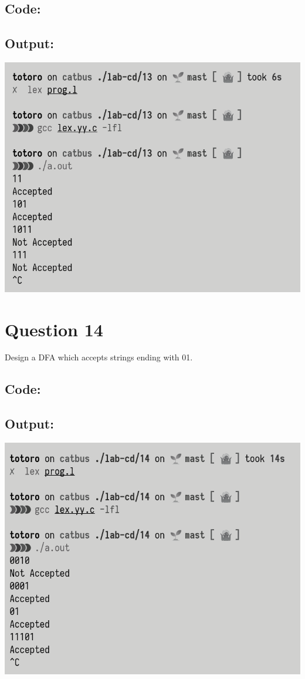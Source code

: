 \documentclass{article}
\begin{document}
\subsection*{Code:}

\newpage
\subsection*{Output:}
\begin{center}
  \includegraphics[width=14cm]{13/out.png}
\end{center}

\newpage
\section*{Question 14}
Design a DFA which accepts strings ending with 01.
\subsection*{Code:}

\newpage
\subsection*{Output:}
\begin{center}
  \includegraphics[width=14cm]{14/out.png}
\end{center}
\end{document}
